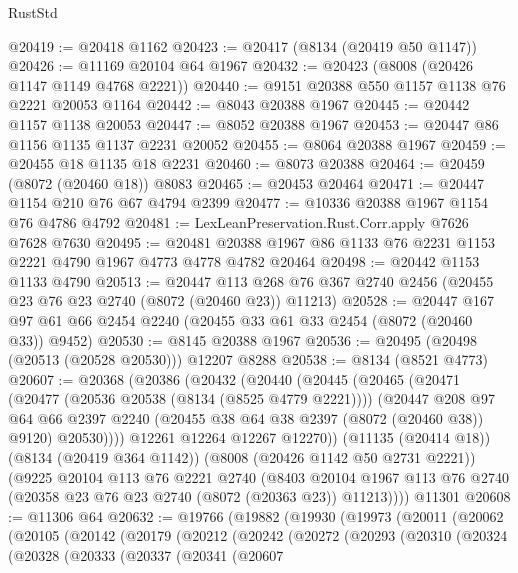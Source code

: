 \begin{lexlean}{RustStd}
\begin{coremodule}
@20419 := @20418 @1162
@20423 := @20417 (@8134 (@20419 @50 @1147))
@20426 := @11169 @20104 @64 @1967
@20432 := @20423 (@8008 (@20426 @1147 @1149 @4768 @2221))
@20440 := @9151 @20388 @550 @1157 @1138 @76 @2221 @20053 @1164
@20442 := @8043 @20388 @1967
@20445 := @20442 @1157 @1138 @20053
@20447 := @8052 @20388 @1967
@20453 := @20447 @86 @1156 @1135 @1137 @2231 @20052
@20455 := @8064 @20388 @1967
@20459 := @20455 @18 @1135 @18 @2231
@20460 := @8073 @20388
@20464 := @20459 (@8072 (@20460 @18)) @8083
@20465 := @20453 @20464
@20471 := @20447 @1154 @210 @76 @67 @4794 @2399
@20477 := @10336 @20388 @1967 @1154 @76 @4786 @4792
@20481 := LexLeanPreservation.Rust.Corr.apply @7626 @7628 @7630
@20495 := @20481 @20388 @1967 @86 @1133 @76 @2231 @1153 @2221 @4790 @1967 @4773 @4778 @4782 @20464
@20498 := @20442 @1153 @1133 @4790
@20513 := @20447
    @113
    @268
    @76
    @367
    @2740
    @2456
    (@20455 @23 @76 @23 @2740 (@8072 (@20460 @23)) @11213)
@20528 := @20447 @167 @97 @61 @66 @2454 @2240 (@20455 @33 @61 @33 @2454 (@8072 (@20460 @33)) @9452)
@20530 := @8145 @20388 @1967
@20536 := @20495 (@20498 (@20513 (@20528 @20530))) @12207 @8288
@20538 := @8134 (@8521 @4773)
@20607 := @20368
    (@20386
      (@20432
        (@20440
          (@20445
            (@20465
              (@20471
                (@20477 (@20536 @20538 (@8134 (@8525 @4779 @2221))))
                (@20447
                  @208
                  @97
                  @64
                  @66
                  @2397
                  @2240
                  (@20455 @38 @64 @38 @2397 (@8072 (@20460 @38)) @9120)
                  @20530))))
          @12261
          @12264
          @12267
          @12270))
      (@11135 (@20414 @18))
      (@8134 (@20419 @364 @1142))
      (@8008 (@20426 @1142 @50 @2731 @2221))
      (@9225
        @20104
        @113
        @76
        @2221
        @2740
        (@8403 @20104 @1967 @113 @76 @2740 (@20358 @23 @76 @23 @2740 (@8072 (@20363 @23)) @11213))))
    @11301
@20608 := @11306 @64
@20632 := @19766
    (@19882
      (@19930
        (@19973
          (@20011
            (@20062
              (@20105
                (@20142
                  (@20179
                    (@20212
                      (@20242
                        (@20272
                          (@20293
                            (@20310
                              (@20324
                                (@20328
                                  (@20333
                                    (@20337
                                      (@20341
                                        (@20607

\end{coremodule}
\end{lexlean}
